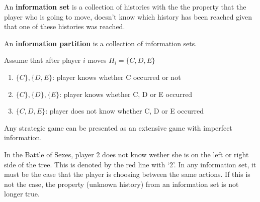 \begin{definition}
    An \textbf{information set} is a collection of histories with the the property that the player who is going to move, doesn't know which history has been reached given that one of these histories was reached.
\end{definition}


\begin{definition}
    An \textbf{information partition} is a collection of information sets.
\end{definition}


\begin{example}
    Assume that after player $i$ moves $H_i = \{C,D,E\}$
    \begin{enumerate}[label=P\arabic*:]
        \item $\{C\}, \{D,E\}$: player knows whether C occurred or not
        \item $\{C\}, \{D\}, \{E\}$: player knows whether C, D or E occurred
        \item $\{C,D,E\}$: player does not know whether C, D or E occurred
    \end{enumerate}
\end{example}

\begin{remark}
    Any strategic game can be presented as an extensive game with imperfect information.
\end{remark}

\begin{example}
    In the Battle of Sexes, player 2 does not know wether she is on the left or right side of the tree. This is denoted by the red line with `2'. In any information set, it must be the case that the player is choosing between the same actions. If this is not the case, the property (unknown history) from an information set is not longer true.

\end{example}


